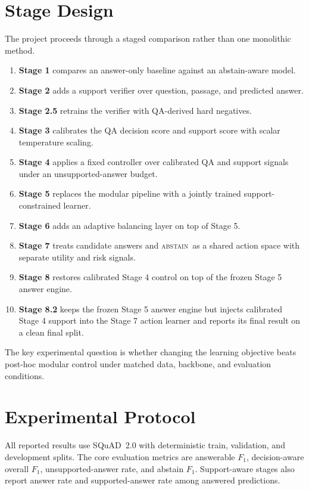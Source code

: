 \documentclass[10pt,twocolumn]{article}
\newcommand{\abstain}{\textsc{abstain}}
\begin{document}
\section{Stage Design}
The project proceeds through a staged comparison rather than one monolithic
method.

\begin{enumerate}[leftmargin=1.25em]
  \item \textbf{Stage 1} compares an answer-only baseline against an
  abstain-aware model.
  \item \textbf{Stage 2} adds a support verifier over question, passage, and
  predicted answer.
  \item \textbf{Stage 2.5} retrains the verifier with QA-derived hard
  negatives.
  \item \textbf{Stage 3} calibrates the QA decision score and support score
  with scalar temperature scaling.
  \item \textbf{Stage 4} applies a fixed controller over calibrated QA and
  support signals under an unsupported-answer budget.
  \item \textbf{Stage 5} replaces the modular pipeline with a jointly trained
  support-constrained learner.
  \item \textbf{Stage 6} adds an adaptive balancing layer on top of Stage 5.
  \item \textbf{Stage 7} treats candidate answers and \abstain\ as a shared
  action space with separate utility and risk signals.
  \item \textbf{Stage 8} restores calibrated Stage 4 control on top of the
  frozen Stage 5 answer engine.
  \item \textbf{Stage 8.2} keeps the frozen Stage 5 answer engine but injects
  calibrated Stage 4 support into the Stage 7 action learner and reports its
  final result on a clean final split.
\end{enumerate}

The key experimental question is whether changing the learning objective beats
post-hoc modular control under matched data, backbone, and evaluation
conditions.

\section{Experimental Protocol}
All reported results use SQuAD~2.0 with deterministic train, validation, and
development splits.
The core evaluation metrics are answerable \(F_1\), decision-aware overall
\(F_1\), unsupported-answer rate, and abstain \(F_1\).
Support-aware stages also report answer rate and supported-answer rate among
answered predictions.
\end{document}
